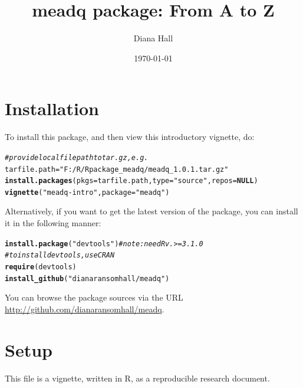 \documentclass{article}\usepackage[]{graphicx}\usepackage[]{color}
\makeatletter
\newcommand{\hlstr}[1]{\textcolor[rgb]{0.192,0.494,0.8}{#1}}%
\newcommand{\hlcom}[1]{\textcolor[rgb]{0.678,0.584,0.686}{\textit{#1}}}%
\newcommand{\hlstd}[1]{\textcolor[rgb]{0.345,0.345,0.345}{#1}}%
\newcommand{\hlkwa}[1]{\textcolor[rgb]{0.161,0.373,0.58}{\textbf{#1}}}%
\newcommand{\hlkwb}[1]{\textcolor[rgb]{0.69,0.353,0.396}{#1}}%
\newcommand{\hlkwc}[1]{\textcolor[rgb]{0.333,0.667,0.333}{#1}}%
\newcommand{\hlkwd}[1]{\textcolor[rgb]{0.737,0.353,0.396}{\textbf{#1}}}%
\newenvironment{kframe}{%
 \def\at@end@of@kframe{}%
 \ifinner\ifhmode%
  \def\at@end@of@kframe{\end{minipage}}%
  \begin{minipage}{\columnwidth}%
 \fi\fi%
 \def\FrameCommand##1{\hskip\@totalleftmargin \hskip-\fboxsep
 \colorbox{shadecolor}{##1}\hskip-\fboxsep
     \hskip-\linewidth \hskip-\@totalleftmargin \hskip\columnwidth}%
 \MakeFramed {\advance\hsize-\width
   \@totalleftmargin\z@ \linewidth\hsize
   \@setminipage}}%
 {\par\unskip\endMakeFramed%
 \at@end@of@kframe}
\newenvironment{knitrout}{}{} %
\makeatother
\begin{document}
\onehalfspacing
\title{meadq package: From A to Z }

\author{Diana Hall}
\date{\today}

\maketitle


\section*{Installation}
To install this package, and then view this introductory vignette, do:

\begin{knitrout}
\color{fgcolor}\begin{kframe}
\begin{alltt}
\hlcom{# provide local file path to tar.gz, e.g.}
\hlstd{tarfile.path} \hlkwb{=} \hlstr{"F:/R/Rpackage_meadq/meadq_1.0.1.tar.gz"}
\hlkwd{install.packages}\hlstd{(}\hlkwc{pkgs} \hlstd{= tarfile.path,} \hlkwc{type} \hlstd{=} \hlstr{"source"}\hlstd{,} \hlkwc{repos} \hlstd{=} \hlkwa{NULL}\hlstd{)}
\hlkwd{vignette}\hlstd{(}\hlstr{"meadq-intro"}\hlstd{,} \hlkwc{package} \hlstd{=} \hlstr{"meadq"}\hlstd{)}
\end{alltt}
\end{kframe}
\end{knitrout}


Alternatively, if you want to get the latest version of the package,
you can install it in the following manner:
\begin{knitrout}
\color{fgcolor}\begin{kframe}
\begin{alltt}
\hlkwd{install.package}\hlstd{(}\hlstr{"devtools"}\hlstd{)}  \hlcom{# note: need R v.>=3.1.0}
\hlcom{# to install devtools, use CRAN}
\hlkwd{require}\hlstd{(devtools)}
\hlkwd{install_github}\hlstd{(}\hlstr{"dianaransomhall/meadq"}\hlstd{)}
\end{alltt}
\end{kframe}
\end{knitrout}

You can browse the package sources via the URL
\url{http://github.com/dianaransomhall/meadq}.


\section*{Setup}
This file is a vignette, written in R, as a reproducible research
document.
\end{document}
